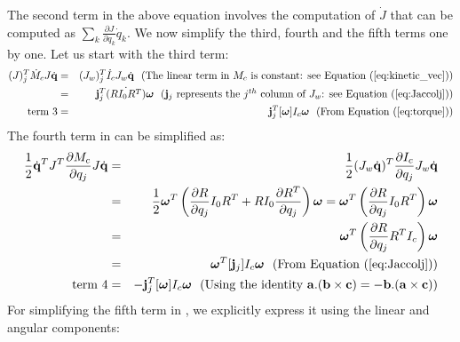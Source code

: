 The second term in the above equation involves the computation of $\dot{J}$ that can be computed as $\sum_k \frac{\partial J}{\partial q_k} \dot{q}_k$. We now simplify the third, fourth and the fifth terms one by one. Let us start with the third term:
\begin{eqnarray}
\label{eq:term3}
\nonumber
(J)_j^T \dot{M}_c J \dot{\vc{q}} & = & (J_w)_j^T \dot{I}_c J_w \dot{\vc{q}} \mbox{\ \ (The linear term in $M_c$ is constant: see \eqnref{kinetic_vec})}\\
\nonumber
& = & \vc{j}_j^T\dot{(RI_0 R^T)}\bm{\omega} \mbox{\ \ ($\vc{j}_j$ represents the $j^{th}$ column of $J_w$: see \eqnref{Jaccolj})} \\
\mbox{term 3} & = & \vc{j}_j^T[\bm{\omega}]I_c \bm{\omega}  \mbox{\ \ (From \eqnref{torque})}
\end{eqnarray}
The fourth term in  can be simplified as:
\begin{eqnarray}
\label{eq:term4}
\nonumber
\frac{1}{2}\dot{\vc{q}}^T J^T \frac{\partial M_c}{\partial q_j} J \dot{\vc{q}} & = & \frac{1}{2} (J_w \dot{\vc{q}})^T \frac{\partial I_c}{\partial q_j} J_w \dot{\vc{q}}\\
\nonumber
& = & \frac{1}{2} \bm{\omega}^T \left ( \frac{\partial R}{\partial q_j}I_0R^T + RI_0\frac{\partial R^T}{\partial q_j} \right )  \bm{\omega} = \bm{\omega}^T \left ( \frac{\partial R}{\partial q_j}I_0R^T \right ) \bm{\omega} \\
\nonumber
& = & \bm{\omega}^T \left ( \frac{\partial R}{\partial q_j}R^T I_c \right ) \bm{\omega}\\
\nonumber
 & = & \bm{\omega}^T [\vc{j}_j] I_c \bm{\omega} \mbox{\ \ (From \eqnref{Jaccolj})}\\
\mbox{term 4}  & = & - \vc{j}_j^T[\bm{\omega}]I_c \bm{\omega} \mbox{\ \ (Using the identity $\vc{a}.(\vc{b}\times\vc{c}) = -\vc{b}.(\vc{a}\times\vc{c}))$}
\end{eqnarray}
For simplifying the fifth term in , we explicitly express it using the linear and angular components:
